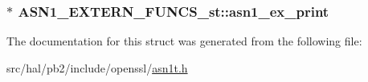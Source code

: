 \subsubsection[{\texorpdfstring{asn1\+\_\+ex\+\_\+print}{asn1_ex_print}}]{$\ast$ A\+S\+N1\+\_\+\+E\+X\+T\+E\+R\+N\+\_\+\+F\+U\+N\+C\+S\+\_\+st\+::asn1\+\_\+ex\+\_\+print}\hypertarget{struct_a_s_n1___e_x_t_e_r_n___f_u_n_c_s__st_a9609c50686e5385236dd12796813ec0e}{}\label{struct_a_s_n1___e_x_t_e_r_n___f_u_n_c_s__st_a9609c50686e5385236dd12796813ec0e}


The documentation for this struct was generated from the following file\+:\begin{DoxyCompactItemize}
\item 
src/hal/pb2/include/openssl/\hyperlink{asn1t_8h}{asn1t.\+h}\end{DoxyCompactItemize}
